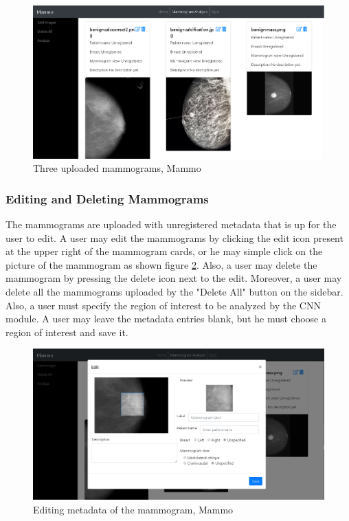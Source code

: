\begin{figure}[h]
	\centering
  	\includegraphics[scale=0.5]{images/uploadMammograms.png}
	 \caption{Three uploaded mammograms, Mammo}
  	\label{fig:uploadMammograms}
\end{figure}

\subsubsection{Editing and Deleting Mammograms}
	\qquad The mammograms are uploaded with unregistered metadata that is up for the user to edit. A user may edit the mammograms by clicking the edit icon present at the upper right of the mammogram cards, or he may simple click on the picture of the mammogram as shown figure \ref{fig:editMammograms}. Also, a user may delete the mammogram by pressing the delete icon next to the edit. Moreover, a user may delete all the mammograms uploaded by the "Delete All" button on the sidebar. Also, a user must specify the region of interest to be analyzed by the CNN module. A user may leave the metadata entries blank, but he must choose a region of interest and save it.

\begin{figure}[h]
	\centering
  	\includegraphics[scale=0.5]{images/editMammograms.png}
	 \caption{Editing metadata of the mammogram, Mammo}
  	\label{fig:editMammograms}
\end{figure}


